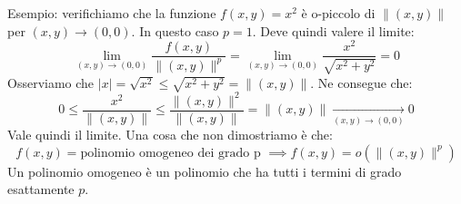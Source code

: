 Esempio: verifichiamo che la funzione $f(x, y) = x^2$ è o-piccolo di $\lVert 
(x, y) \rVert$ per $(x, y) \to (0, 0)$. In questo caso $p = 1$. Deve quindi 
valere il limite:
\begin{equation*}
	\lim_{(x, y) \to (0, 0)} \dfrac{f(x, y)}{\lVert (x, y) \rVert^p} = 
	\lim_{(x, y) \to (0, 0)} \dfrac{x^2}{\sqrt{x^2 + y^2}} = 0
\end{equation*}
Osserviamo che $|x| = \sqrt{x^2} \leq \sqrt{x^2 + y^2} = \lVert (x, y) \rVert$. 
Ne consegue che:
\begin{equation*}
	0 \leq \dfrac{x^2}{\lVert (x, y) \rVert} \leq \dfrac{\lVert (x, y) 
	\rVert^2}{\lVert (x, y) \rVert} = \lVert (x, y) \rVert 
	\xrightarrow[(x, y) \to (0, 0)]{} 0
\end{equation*}
Vale quindi il limite. Una cosa che non dimostriamo è che:
\begin{equation*}
	f(x, y) = \text{polinomio omogeneo dei grado p } \implies f(x, y) = 
	o(\lVert (x, y) \rVert^p)
\end{equation*}
Un polinomio omogeneo è un polinomio che ha tutti i termini di grado 
esattamente $p$.

